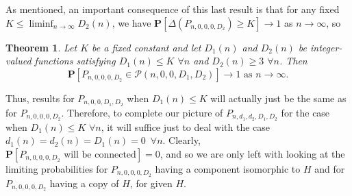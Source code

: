 \documentclass{article}
\newtheorem{Theorem}{Theorem}
\newtheorem{Proof of Theorem}{Proof of Theorem}
\begin{document}
\phantom{p}














As mentioned, an important consequence of this last result 
is that for any fixed $K \leq \liminf_{n \to \infty} D_{2}(n)$,
we have $\mathbf{P}[\Delta(P_{n,0,0,0,D_{2}}) \geq K] \to 1$ as $n \to \infty$,
so 















\begin{Theorem} \label{bounded147}
Let $K$ be a fixed constant and let $D_{1}(n)$ and $D_{2}(n)$ be integer-valued functions satisfying
$D_{1}(n) \leq K$ $\forall n$ and $D_{2}(n) \geq 3$ $\forall n$.
Then
\begin{displaymath}
\mathbf{P}[P_{n,0,0,0,D_{2}} \in \mathcal{P}(n,0,0,D_{1},D_{2})] \to 1 \textrm{ as } n \to \infty.
\end{displaymath} 
\end{Theorem}

\phantom{p}















Thus, results for $P_{n,0,0,D_{1},D_{2}}$ when $D_{1}(n) \leq K$ will actually just be the same as for $P_{n,0,0,0,D_{2}}$.
Therefore, to complete our picture of $P_{n,d_{1},d_{2},D_{1},D_{2}}$ for the case when $D_{1}(n) \leq K$ $\forall n$,
it will suffice just to deal with the case $d_{1}(n)=d_{2}(n)=D_{1}(n)=0$~$\forall n$.
Clearly, $\mathbf{P}[P_{n,0,0,0,D_{2}} \textrm{ will be connected}]=0$,
and so we are only left with looking at the limiting probabilities for
$P_{n,0,0,0,D_{2}}$ having a component isomorphic to $H$
and for $P_{n,0,0,0,D_{2}}$ having a copy of $H$,
for given $H$. \\
\\
\end{document}
